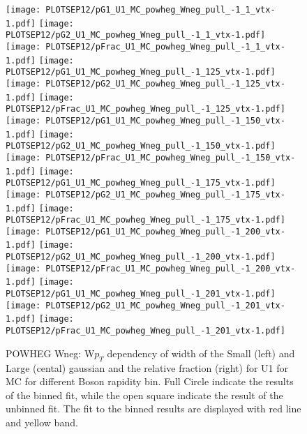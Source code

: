 \documentclass[41pt,a4paper,oneside]{report}
\begin{document}
\begin{figure}[h!]
  \begin{center}
    \texttt{[image: PLOTSEP12/pG1\_U1\_MC\_powheg\_Wneg\_pull\_-1\_1\_vtx-1.pdf]}
    \texttt{[image: PLOTSEP12/pG2\_U1\_MC\_powheg\_Wneg\_pull\_-1\_1\_vtx-1.pdf]}
    \texttt{[image: PLOTSEP12/pFrac\_U1\_MC\_powheg\_Wneg\_pull\_-1\_1\_vtx-1.pdf]} 
    \texttt{[image: PLOTSEP12/pG1\_U1\_MC\_powheg\_Wneg\_pull\_-1\_125\_vtx-1.pdf]}
    \texttt{[image: PLOTSEP12/pG2\_U1\_MC\_powheg\_Wneg\_pull\_-1\_125\_vtx-1.pdf]}
    \texttt{[image: PLOTSEP12/pFrac\_U1\_MC\_powheg\_Wneg\_pull\_-1\_125\_vtx-1.pdf]} 
    \texttt{[image: PLOTSEP12/pG1\_U1\_MC\_powheg\_Wneg\_pull\_-1\_150\_vtx-1.pdf]}
    \texttt{[image: PLOTSEP12/pG2\_U1\_MC\_powheg\_Wneg\_pull\_-1\_150\_vtx-1.pdf]}
    \texttt{[image: PLOTSEP12/pFrac\_U1\_MC\_powheg\_Wneg\_pull\_-1\_150\_vtx-1.pdf]} 
    \texttt{[image: PLOTSEP12/pG1\_U1\_MC\_powheg\_Wneg\_pull\_-1\_175\_vtx-1.pdf]}
    \texttt{[image: PLOTSEP12/pG2\_U1\_MC\_powheg\_Wneg\_pull\_-1\_175\_vtx-1.pdf]}
    \texttt{[image: PLOTSEP12/pFrac\_U1\_MC\_powheg\_Wneg\_pull\_-1\_175\_vtx-1.pdf]} 
    \texttt{[image: PLOTSEP12/pG1\_U1\_MC\_powheg\_Wneg\_pull\_-1\_200\_vtx-1.pdf]}
    \texttt{[image: PLOTSEP12/pG2\_U1\_MC\_powheg\_Wneg\_pull\_-1\_200\_vtx-1.pdf]}
    \texttt{[image: PLOTSEP12/pFrac\_U1\_MC\_powheg\_Wneg\_pull\_-1\_200\_vtx-1.pdf]} 
    \texttt{[image: PLOTSEP12/pG1\_U1\_MC\_powheg\_Wneg\_pull\_-1\_201\_vtx-1.pdf]}
    \texttt{[image: PLOTSEP12/pG2\_U1\_MC\_powheg\_Wneg\_pull\_-1\_201\_vtx-1.pdf]}
    \texttt{[image: PLOTSEP12/pFrac\_U1\_MC\_powheg\_Wneg\_pull\_-1\_201\_vtx-1.pdf]} 
    \caption{POWHEG Wneg: W$p_{T}$ dependency of width of the Small (left) and Large (cental) gaussian and the relative fraction (right) for U1 for MC for different Boson rapidity bin. Full Circle indicate the results of the binned fit, while the open square indicate the result of the unbinned fit. The fit to the binned results are displayed with red line and yellow band.
\newline
}
    \label{fig:SmallLargeU1POWneg}
  \end{center}
\end{figure}
\end{document}
